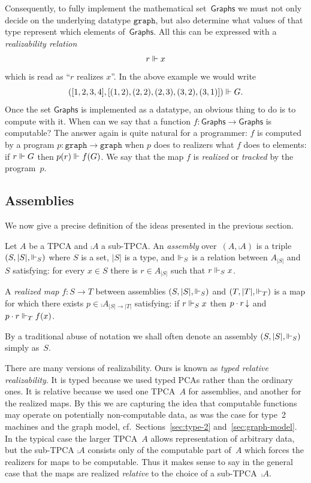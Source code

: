 %
Consequently, to fully implement the mathematical
set~$\mathsf{Graphs}$ we must not only decide on the underlying
datatype $\mathtt{graph}$, but also determine what values of that type
represent which elements of~$\mathsf{Graphs}$. All this can be
expressed with a \emph{realizability relation}
%
\begin{equation*}
  r \Vdash x
\end{equation*}
%
which is read as ``$r$ realizes $x$''. In the above example we would
write
%
\begin{equation*}
([1, 2, 3, 4], [(1,2), (2,2), (2,3), (3,2), (3,1)]) \Vdash G.
\end{equation*}
%
Once the set $\mathsf{Graphs}$ is implemented as a datatype, an
obvious thing to do is to compute with it. When can we say that a
function $f : \mathsf{Graphs} \to \mathsf{Graphs}$ is computable? The
answer again is quite natural for a programmer: $f$ is computed by a
program $p : \mathtt{graph} \to \mathtt{graph}$ when $p$ does to
realizers what $f$ does to elements: if $r \Vdash G$ then $p(r) \Vdash
f(G)$. We say that the map $f$ is \emph{realized} or \emph{tracked} by
the program~$p$.


\subsection{Assemblies}
\label{sec:assemblies}

We now give a precise definition of the ideas presented in the
previous section.

\begin{definition}[Assemblies]
  Let $A$ be a TPCA and $\comp{A}$ a sub-TPCA. An \emph{assembly}
  over~$(A, \comp{A})$ is a triple $(S, |S|, {\Vdash_S})$ where $S$ is a
  set, $|S|$ is a type, and $\Vdash_S$ is a relation between $A_{|S|}$
  and~$S$ satisfying: for every $x \in S$ there is $r \in A_{|S|}$
  such that $r \Vdash_S x$.

  A \emph{realized map} $f : S \to T$ between assemblies $(S, |S|,
  {\Vdash_S})$ and $(T, |T|, {\Vdash_T})$ is a map for which there exists $p
  \in \comp{A}_{|S| \to |T|}$ satisfying: if $r \Vdash_S x$ then $p
    \cdot r\,{\downarrow}$ and $p \cdot r \Vdash_T f(x)$.
\end{definition}

\noindent
By a traditional abuse of notation we shall often denote an assembly
$(S, |S|, {\Vdash_S})$ simply as~$S$.

There are many versions of realizability. Ours is known as \emph{typed
  relative realizability}. It is typed because we used typed PCAs
rather than the ordinary ones. It is relative because we used one
TPCA~$A$ for assemblies, and another for the realized maps. By this we
are capturing the idea that computable functions may operate on
potentially non-computable data, as was the case for type~2 machines
and the graph model, cf.\ Sections~\ref{sec:type-2}
and~\ref{sec:graph-model}. In the typical case the larger TPCA~$A$
allows representation of arbitrary data, but the sub-TPCA $\comp{A}$
consists only of the computable part of~$A$ which forces the realizers
for maps to be computable. Thus it makes sense to say in the general
case that the maps are realized \emph{relative} to the choice of a
sub-TPCA~$\comp{A}$.

